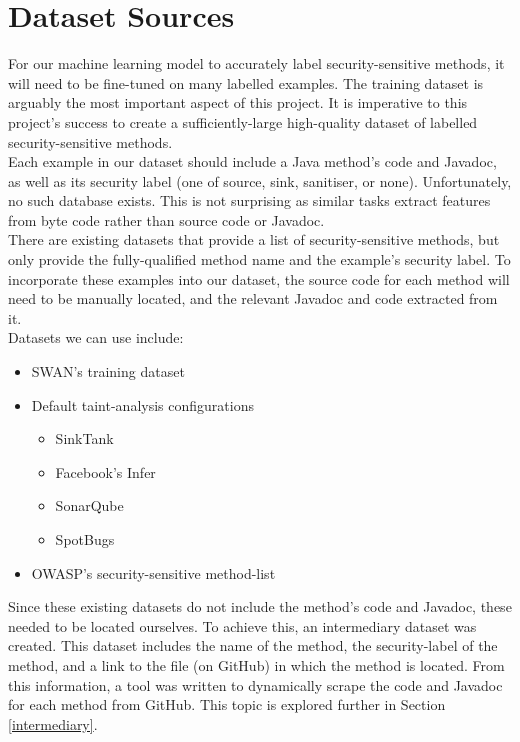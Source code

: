 \label{dataset-creation}
\section{Dataset Sources}

\noindent
For our machine learning model to accurately label security-sensitive methods, it will need to be fine-tuned on many labelled examples. The training dataset is arguably the most important aspect of this project. It is imperative to this project's success to create a sufficiently-large high-quality dataset of labelled security-sensitive methods. \\

\noindent
Each example in our dataset should include a Java method's code and Javadoc, as well as its security label (one of source, sink, sanitiser, or none). Unfortunately, no such database exists. This is not surprising as similar tasks extract features from byte code rather than source code or Javadoc. \\

\noindent
There are existing datasets that provide a list of security-sensitive methods, but only provide the fully-qualified method name and the example's security label. To incorporate these examples into our dataset, the source code for each method will need to be manually located, and the relevant Javadoc and code extracted from it. \\

\noindent
Datasets we can use include:
\begin{itemize}
    \item SWAN's training dataset \cite{swan_github}
    \item Default taint-analysis configurations
    \begin{itemize}
        \item SinkTank \cite{sinktank}
        \item Facebook's Infer \cite{infer}
        \item SonarQube \cite{sonarqube}
        \item SpotBugs \cite{spotbugs}
    \end{itemize}

    \item OWASP's security-sensitive method-list \cite{owasp_srm}

\end{itemize}

\noindent
Since these existing datasets do not include the method's code and Javadoc, these needed to be located ourselves. To achieve this, an intermediary dataset was created. This dataset includes the name of the method, the security-label of the method, and a link to the file (on GitHub) in which the method is located. From this information, a tool was written to dynamically scrape the code and Javadoc for each method from GitHub. This topic is explored further in Section \ref{intermediary}. \\

